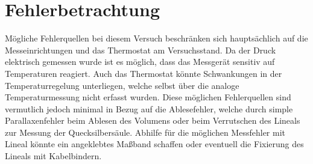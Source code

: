 \section{Fehlerbetrachtung}
\label{sec:fehler}

Mögliche Fehlerquellen bei diesem Versuch beschränken sich hauptsächlich auf die Messeinrichtungen und das Thermostat am Versuchsstand. Da der Druck elektrisch gemessen wurde ist es möglich, dass das Messgerät sensitiv auf Temperaturen reagiert. Auch das Thermostat könnte Schwankungen in der Temperaturregelung unterliegen, welche selbst über die analoge Temperaturmessung nicht erfasst wurden. \linebreak
Diese möglichen Fehlerquellen sind vermutlich jedoch minimal in Bezug auf die Ablesefehler, welche durch simple Parallaxenfehler beim Ablesen des Volumens oder beim Verrutschen des Lineals zur Messung der Quecksilbersäule. Abhilfe für die möglichen Messfehler mit Lineal könnte ein angeklebtes Maßband schaffen oder eventuell die Fixierung des Lineals mit Kabelbindern.
